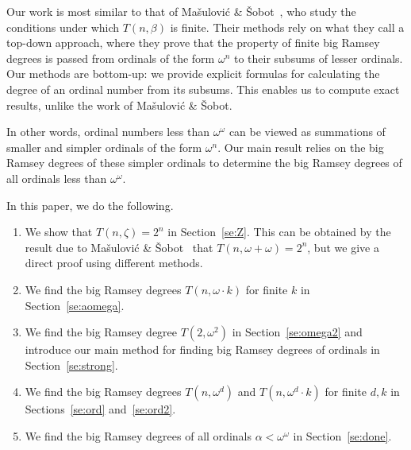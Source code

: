 \documentclass[11pt]{article}
\newcommand{\om}{\omega}
\newcommand{\numpoints}{n}
\theoremstyle{plain}
\theoremstyle{definition}
\begin{document}
Our work is most similar to that of Ma\v{s}ulovi\'{c} \& \v{S}obot~\cite{MS-2021},
who study the conditions under which $T(n,\beta)$ is finite. Their methods
rely on what they call a top-down approach, where they prove that the
property of finite big Ramsey degrees is passed from ordinals of the form $\om^n$
to their subsums of lesser ordinals. Our methods are bottom-up: we provide explicit formulas
for calculating the degree of an ordinal number from its subsums. This enables
us to compute exact results, unlike the work of Ma\v{s}ulovi\'{c} \& \v{S}obot.

In other words, ordinal
numbers less than $\om^\om$ can be viewed as summations of smaller
and simpler ordinals of the form $\om^n$. Our main result relies on the
big Ramsey degrees of these simpler ordinals to determine the big Ramsey
degrees of all ordinals less than $\om^\om.$

In this paper, we do the following.

\begin{enumerate}
\item
We show that $T(\numpoints,\zeta)=2^{\numpoints}$ in Section~\ref{se:Z}. This can be obtained
by the result due to Ma\v{s}ulovi\'{c} \& \v{S}obot~\cite{MS-2021} that 
$T(\numpoints,\omega+\omega)=2^\numpoints$, but we give a direct proof using different methods.
\item
We find the big Ramsey degrees $T(n, \om \cdot k)$ for finite $k$ in Section~\ref{se:aomega}.
\item
We find the big Ramsey degree $T(2, \om^2)$ in Section~\ref{se:omega2} 
and introduce our main method for finding big Ramsey degrees of ordinals
in Section~\ref{se:strong}.
\item We find the big Ramsey degrees $T(n, \om^d)$ and
$T(n, \om^d \cdot k)$ for finite $d,k$ in Sections~\ref{se:ord} and~\ref{se:ord2}.
\item We find the big Ramsey degrees of all ordinals $\alpha<\omega^\omega$
in Section~\ref{se:done}.
\end{enumerate}






\end{document}
